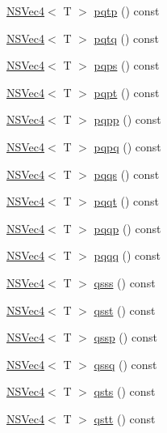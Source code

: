 \begin{DoxyCompactItemize}
\item 
\hyperlink{structNSVec4}{N\-S\-Vec4}$<$ T $>$ \hyperlink{structNSVec4_a0b7bebbd9f4b19a13ef60f0697151d80}{pqtp} () const 
\item 
\hyperlink{structNSVec4}{N\-S\-Vec4}$<$ T $>$ \hyperlink{structNSVec4_a25d2fa308f17a219c2226c7c0457a2c6}{pqtq} () const 
\item 
\hyperlink{structNSVec4}{N\-S\-Vec4}$<$ T $>$ \hyperlink{structNSVec4_a1ec0734cabe1d04981ff3941698655b2}{pqps} () const 
\item 
\hyperlink{structNSVec4}{N\-S\-Vec4}$<$ T $>$ \hyperlink{structNSVec4_a195bdd4d4b245f17b15303bff304910f}{pqpt} () const 
\item 
\hyperlink{structNSVec4}{N\-S\-Vec4}$<$ T $>$ \hyperlink{structNSVec4_ac923e80c3cb6112f85761f51751b35f1}{pqpp} () const 
\item 
\hyperlink{structNSVec4}{N\-S\-Vec4}$<$ T $>$ \hyperlink{structNSVec4_a61a67d326186252503ffa90c6bab82eb}{pqpq} () const 
\item 
\hyperlink{structNSVec4}{N\-S\-Vec4}$<$ T $>$ \hyperlink{structNSVec4_ac1f53c58b78eb58aacb4d93cc7f59d00}{pqqs} () const 
\item 
\hyperlink{structNSVec4}{N\-S\-Vec4}$<$ T $>$ \hyperlink{structNSVec4_ab457121a7604dac0a1d3db5cf7501d7d}{pqqt} () const 
\item 
\hyperlink{structNSVec4}{N\-S\-Vec4}$<$ T $>$ \hyperlink{structNSVec4_a7e959eca844cc4e0a7146951911476de}{pqqp} () const 
\item 
\hyperlink{structNSVec4}{N\-S\-Vec4}$<$ T $>$ \hyperlink{structNSVec4_a933ec09c04b2de379e805aa80dfa249c}{pqqq} () const 
\item 
\hyperlink{structNSVec4}{N\-S\-Vec4}$<$ T $>$ \hyperlink{structNSVec4_a85c620fed63abf9238370146954fa596}{qsss} () const 
\item 
\hyperlink{structNSVec4}{N\-S\-Vec4}$<$ T $>$ \hyperlink{structNSVec4_aed1629b67f1b3e664dbc19974c2a480c}{qsst} () const 
\item 
\hyperlink{structNSVec4}{N\-S\-Vec4}$<$ T $>$ \hyperlink{structNSVec4_af6c3f7c010ec7256cf7fae0b343dc794}{qssp} () const 
\item 
\hyperlink{structNSVec4}{N\-S\-Vec4}$<$ T $>$ \hyperlink{structNSVec4_a144584e934c813bccf1869a50d186a3f}{qssq} () const 
\item 
\hyperlink{structNSVec4}{N\-S\-Vec4}$<$ T $>$ \hyperlink{structNSVec4_a6bde3af2e41e1c08a9084038cd5e4612}{qsts} () const 
\item 
\hyperlink{structNSVec4}{N\-S\-Vec4}$<$ T $>$ \hyperlink{structNSVec4_ad4323043f597be0e1dd496f288963710}{qstt} () const 

\end{DoxyCompactItemize}

